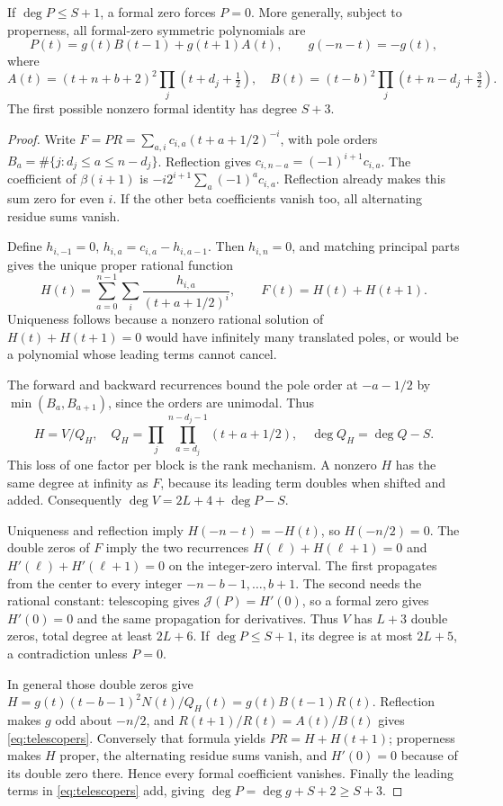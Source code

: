 \begin{theorem}\label{thm:rank}
If $\deg P\leq S+1$, a formal zero forces $P=0$. More generally,
subject to properness, all formal-zero symmetric polynomials are
\begin{equation}\label{eq:telescopers}
 P(t)=g(t)B(t-1)+g(t+1)A(t),\qquad g(-n-t)=-g(t),
\end{equation}
where
\[
 A(t)=(t+n+b+2)^2\prod_j(t+d_j+\tfrac12),\quad
 B(t)=(t-b)^2\prod_j(t+n-d_j+\tfrac32).
\]
The first possible nonzero formal identity has degree $S+3$.
\end{theorem}
\begin{proof}
Write $F=PR=\sum_{a,i}c_{i,a}(t+a+1/2)^{-i}$, with pole orders
$B_a=\#\{j:d_j\leq a\leq n-d_j\}$. Reflection gives
$c_{i,n-a}=(-1)^{i+1}c_{i,a}$. The coefficient of $\beta(i+1)$ is
$-i2^{i+1}\sum_a(-1)^ac_{i,a}$. Reflection already makes this sum
zero for even $i$. If the other beta coefficients vanish too, all
alternating residue sums vanish.

Define $h_{i,-1}=0$, $h_{i,a}=c_{i,a}-h_{i,a-1}$. Then $h_{i,n}=0$,
and matching principal parts gives the unique proper rational function
\[
 H(t)=\sum_{a=0}^{n-1}\sum_i\frac{h_{i,a}}{(t+a+1/2)^i},
 \qquad F(t)=H(t)+H(t+1).
\]
Uniqueness follows because a nonzero rational solution of
$H(t)+H(t+1)=0$ would have infinitely many translated poles, or would
be a polynomial whose leading terms cannot cancel.

The forward and backward recurrences bound the pole order at $-a-1/2$
by $\min(B_a,B_{a+1})$, since the orders are unimodal. Thus
\[
 H=V/Q_H,\quad
 Q_H=\prod_j\prod_{a=d_j}^{n-d_j-1}(t+a+1/2),\quad
 \deg Q_H=\deg Q-S.
\]
This loss of one factor per block is the rank mechanism. A nonzero
$H$ has the same degree at infinity as $F$, because its leading term
doubles when shifted and added. Consequently
$\deg V=2L+4+\deg P-S$.

Uniqueness and reflection imply $H(-n-t)=-H(t)$, so $H(-n/2)=0$.
The double zeros of $F$ imply the two recurrences
$H(\ell)+H(\ell+1)=0$ and $H'(\ell)+H'(\ell+1)=0$ on the
integer-zero interval. The first propagates from the center to every
integer $-n-b-1,\ldots,b+1$. The second needs the rational constant:
telescoping gives $\mathcal J(P)=H'(0)$, so a formal zero gives
$H'(0)=0$ and the same propagation for derivatives. Thus $V$ has
$L+3$ double zeros, total degree at least $2L+6$. If $\deg P\leq S+1$,
its degree is at most $2L+5$, a contradiction unless $P=0$.

In general those double zeros give
$H=g(t)(t-b-1)^2N(t)/Q_H(t)=g(t)B(t-1)R(t)$.
Reflection makes $g$ odd about $-n/2$, and
$R(t+1)/R(t)=A(t)/B(t)$ gives \eqref{eq:telescopers}. Conversely that
formula yields $PR=H+H(t+1)$; properness makes $H$ proper, the
alternating residue sums vanish, and $H'(0)=0$ because of its double
zero there. Hence every formal coefficient vanishes. Finally the
leading terms in \eqref{eq:telescopers} add, giving
$\deg P=\deg g+S+2\geq S+3$.
\end{proof}


